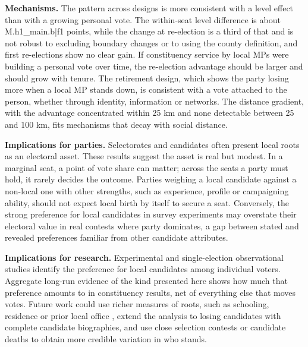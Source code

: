 \documentclass[11pt,a4paper]{article}
\begin{document}
\textbf{Mechanisms.} The pattern across designs is more consistent with a level effect than with a growing personal vote. The within-seat level difference is about {{M.h1_main.b|f1}} points, while the change at re-election is a third of that and is not robust to excluding boundary changes or to using the county definition, and first re-elections show no clear gain. If constituency service by local MPs were building a personal vote over time, the re-election advantage should be larger and should grow with tenure. The retirement design, which shows the party losing more when a local MP stands down, is consistent with a vote attached to the person, whether through identity, information or networks. The distance gradient, with the advantage concentrated within 25 km and none detectable between 25 and 100 km, fits mechanisms that decay with social distance.

\textbf{Implications for parties.} Selectorates and candidates often present local roots as an electoral asset. These results suggest the asset is real but modest. In a marginal seat, a point of vote share can matter; across the seats a party must hold, it rarely decides the outcome. Parties weighing a local candidate against a non-local one with other strengths, such as experience, profile or campaigning ability, should not expect local birth by itself to secure a seat. Conversely, the strong preference for local candidates in survey experiments \citep{campbellcowley2014} may overstate their electoral value in real contests where party dominates, a gap between stated and revealed preferences familiar from other candidate attributes.

\textbf{Implications for research.} Experimental and single-election observational studies identify the preference for local candidates among individual voters. Aggregate long-run evidence of the kind presented here shows how much that preference amounts to in constituency results, net of everything else that moves votes. Future work could use richer measures of roots, such as schooling, residence or prior local office \citep{middleton2019}, extend the analysis to losing candidates with complete candidate biographies, and use close selection contests or candidate deaths to obtain more credible variation in who stands.
\end{document}
